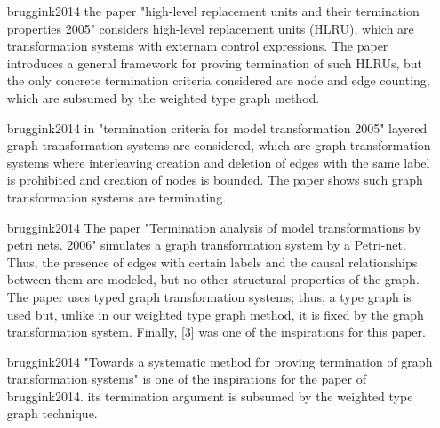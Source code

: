 \begin{itemize}
    \item[bruggink2014] the paper "high-level replacement units and their termination properties 2005" considers high-level replacement units (HLRU), which are transformation systems with externam control expressions. The paper introduces a general framework for proving termination of such HLRUs, but the only concrete termination criteria considered are node and edge counting, which are subsumed by the weighted type graph method.
    \item[bruggink2014] in "termination criteria for model transformation 2005" layered graph transformation systems are considered, which are graph transformation systems where interleaving creation and deletion of edges with the same label is prohibited and creation of nodes is bounded. The paper shows such graph transformation systems are terminating.
    \item[bruggink2014] The paper "Termination analysis of model transformations by petri nets. 2006" simulates a graph transformation system by a Petri-net. Thus, the presence of edges with certain labels and the causal relationships between them are modeled, but no other structural properties of the graph. The paper uses typed graph transformation systems; thus, a type graph is used but, unlike in our weighted type graph method, it is fixed by the graph transformation system. Finally, [3] was one of the inspirations for this paper. 
    \item[bruggink2014] "Towards a systematic method for proving termination of graph transformation systems" is one of the inspirations for the paper of bruggink2014. its termination argument is subsumed by the weighted type graph technique.
\end{itemize}
